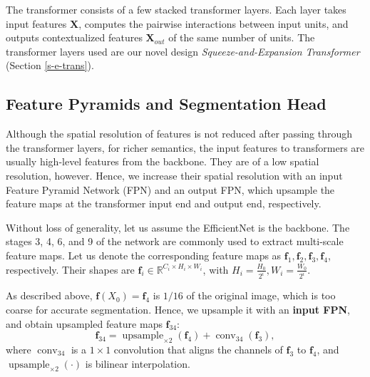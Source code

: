 \documentclass{article}
\begin{document}
The transformer consists of a few stacked transformer layers. Each layer takes input features $\boldsymbol{X}$, computes the pairwise interactions between input units, and outputs contextualized features $\boldsymbol{X}_{out}$ of the same number of units.
The transformer layers used are our novel design \emph{Squeeze-and-Expansion Transformer} (Section \ref{s-e-trans}).

\subsection{Feature Pyramids and Segmentation Head}
Although the spatial resolution of features is not reduced after passing through the transformer layers, for richer semantics, the input features to transformers are usually high-level features from the backbone. They are of a low spatial resolution, however. Hence, we increase their spatial resolution with an input Feature Pyramid Network (FPN) \cite{panet} and an output FPN, which upsample the feature maps at the transformer input end and output end, respectively.

Without loss of generality, let us assume the EfficientNet is the backbone. The stages 3, 4, 6, and 9 of the network are commonly used to extract multi-scale feature maps. Let us denote the corresponding feature maps as $\boldsymbol{f}_1, \boldsymbol{f}_2, \boldsymbol{f}_3, \boldsymbol{f}_4$, respectively. Their shapes are $\boldsymbol{f}_i\in \mathbb{R}^{C_i \times H_i \times W_i}$, with $H_i = \frac{H_0}{2^i}, W_i = \frac{W_0}{2^i}$.

As described above, $\boldsymbol{f}(X_0) = \boldsymbol{f}_4$ is $1/16$ of the original image, which is too coarse for accurate segmentation. Hence, we upsample it with an \textbf{input FPN}, and obtain upsampled feature maps $\boldsymbol{f}_{34}$:
\begin{equation}
    \boldsymbol{f}_{34} = \operatorname{upsample}_{\times 2}(\boldsymbol{f}_4) + \operatorname{conv}_{34}(\boldsymbol{f}_3),
\end{equation}
where $\operatorname{conv}_{34}$ is a $1\times 1$ convolution that aligns the channels of $\boldsymbol{f}_3$ to $\boldsymbol{f}_4$, and $\operatorname{upsample}_{\times 2}(\cdot)$ is bilinear interpolation.
\end{document}
